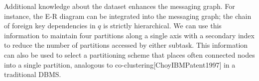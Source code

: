 Additional knowledge about the dataset enhances the messaging graph.  For instance, the E-R diagram can be integrated into the messaging graph; the chain of foreign key dependencies in $q$ is strictly hierarchical.  We can use this information to maintain four partitions along a single axis with a secondary index to reduce the number of partitions accessed by either subtask.  This information can also be used to select a partitioning scheme that places often connected nodes into a single partition, analogous to co-clustering[ChoyIBMPatent1997] in a traditional DBMS.
